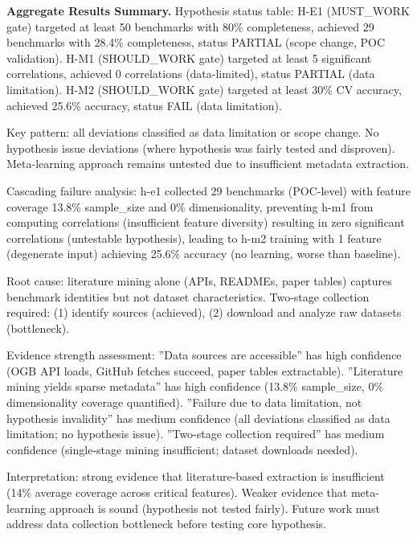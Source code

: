 \textbf{Aggregate Results Summary.} Hypothesis status table: H-E1 (MUST\_WORK gate) targeted at least 50 benchmarks with 80\% completeness, achieved 29 benchmarks with 28.4\% completeness, status PARTIAL (scope change, POC validation). H-M1 (SHOULD\_WORK gate) targeted at least 5 significant correlations, achieved 0 correlations (data-limited), status PARTIAL (data limitation). H-M2 (SHOULD\_WORK gate) targeted at least 30\% CV accuracy, achieved 25.6\% accuracy, status FAIL (data limitation).

Key pattern: all deviations classified as data limitation or scope change. No hypothesis issue deviations (where hypothesis was fairly tested and disproven). Meta-learning approach remains untested due to insufficient metadata extraction.

Cascading failure analysis: h-e1 collected 29 benchmarks (POC-level) with feature coverage 13.8\% sample\_size and 0\% dimensionality, preventing h-m1 from computing correlations (insufficient feature diversity) resulting in zero significant correlations (untestable hypothesis), leading to h-m2 training with 1 feature (degenerate input) achieving 25.6\% accuracy (no learning, worse than baseline).

Root cause: literature mining alone (APIs, READMEs, paper tables) captures benchmark identities but not dataset characteristics. Two-stage collection required: (1) identify sources (achieved), (2) download and analyze raw datasets (bottleneck).

Evidence strength assessment: ''Data sources are accessible'' has high confidence (OGB API loads, GitHub fetches succeed, paper tables extractable). ''Literature mining yields sparse metadata'' has high confidence (13.8\% sample\_size, 0\% dimensionality coverage quantified). ''Failure due to data limitation, not hypothesis invalidity'' has medium confidence (all deviations classified as data limitation; no hypothesis issue). ''Two-stage collection required'' has medium confidence (single-stage mining insufficient; dataset downloads needed).

Interpretation: strong evidence that literature-based extraction is insufficient (14\% average coverage across critical features). Weaker evidence that meta-learning approach is sound (hypothesis not tested fairly). Future work must address data collection bottleneck before testing core hypothesis.
